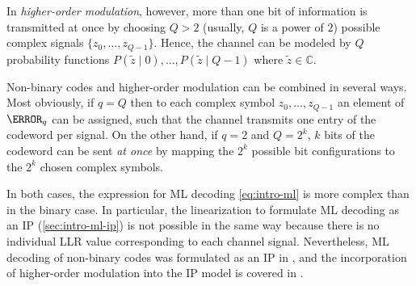 In \emph{higher-order modulation}, however, more than one bit of information is transmitted at once by choosing $Q>2$ (usually, $Q$ is a power of $2$) possible complex signals $\{z_0,\dotsc,z_{Q-1}\}$. Hence, the channel can be modeled by $Q$ probability functions $P(\tilde z∣0),\dotsc,P(\tilde z∣Q-1)$ where $\tilde z ∈ ℂ$.


Non-binary codes and higher-order modulation can be combined in several ways. Most obviously, if $q=Q$ then to each complex symbol $z_0,\dotsc,z_{Q-1}$ an element of $\F_q$ can be assigned, such that the channel transmits one entry of the codeword per signal. On the other hand, if \eg $q=2$ and $Q=2^k$, $k$ bits of the codeword can be sent \emph{at once} by mapping the $2^k$ possible bit configurations to the $2^k$ chosen complex symbols.

In both cases, the expression for ML decoding \cref{eq:intro-ml} is more complex than in the binary case. In particular, the linearization to formulate ML decoding as an IP (\cref{sec:intro-ml-ip}) is not possible in the same way because there is no individual LLR value corresponding to each channel signal. Nevertheless, ML decoding of non-binary codes was formulated as an IP in \cite{Flanagan+09NonBinary}, and the incorporation of higher-order modulation into the IP model is covered in \cite{Scholl+12MLvsBP}.